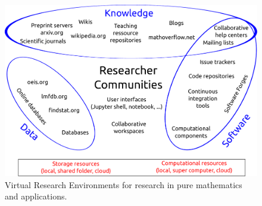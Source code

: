 \begin{figure}
  \centerline{\includegraphics[width=\textwidth]{Pictures/TheBigPicture.pdf}}
  \caption{Virtual Research Environments for research in pure
    mathematics and applications.}
  \label{fig:thebigpicture}
\end{figure}

